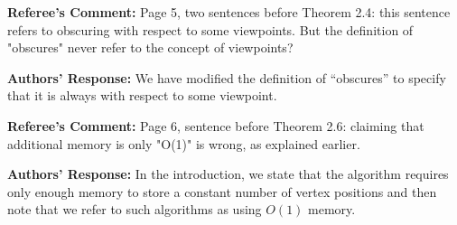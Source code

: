 \documentclass{article}
\newenvironment{comm}{\noindent\textbf{Referee's Comment:}}{}
\newenvironment{resp}{\noindent\textbf{Authors' Response:}}{}
\begin{document}
\begin{comm}
Page 5, two sentences before Theorem 2.4: this
sentence refers to obscuring with respect to
some viewpoints.  But the definition of "obscures"
never refer to the concept of viewpoints?
\end{comm} 

\begin{resp}
We have modified the definition of ``obscures'' to specify that it is
always with respect to some viewpoint.
\end{resp} 


\begin{comm}
Page 6, sentence before Theorem 2.6: claiming that additional
memory is only "O(1)" is wrong, as explained earlier.
\end{comm} 

\begin{resp}
In the introduction, we state that the algorithm requires only enough
memory to store a constant number of vertex positions and then note
that we refer to such algorithms as using $O(1)$ memory.
\end{resp}
\end{document}
